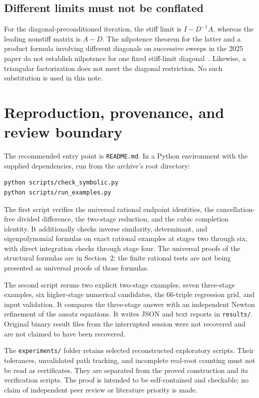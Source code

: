 \documentclass[11pt]{article}
\theoremstyle{remark}
\begin{document}
\subsection{Different limits must not be conflated}
For the diagonal-preconditioned iteration, the stiff limit is
$I-D^{-1}A$, whereas the leading nonstiff matrix is $A-D$. The nilpotence theorem
for the latter and a product formula involving different diagonals on successive
sweeps in the 2025 paper do not establish nilpotence for one fixed stiff-limit
diagonal~\cite[\S\S2.2.2--2.2.4]{sdc}. Likewise, a triangular factorization does
not meet the diagonal restriction. No such substitution is used in this note.

\section{Reproduction, provenance, and review boundary}
The recommended entry point is \texttt{README.md}. In a Python environment with
the supplied dependencies, run from the archive's root directory:
\begin{verbatim}
python scripts/check_symbolic.py
python scripts/run_examples.py
\end{verbatim}
The first script verifies the universal rational endpoint identities, the
cancellation-free divided difference, the two-stage reduction, and the cubic
completion identity. It additionally checks inverse similarity, determinant,
and eigenpolynomial formulas on exact rational examples at stages two through
six, with direct integration checks through stage four. The universal proofs of
the structural formulas are in Section~2; the finite rational tests are not
being presented as universal proofs of those formulas.

The second script reruns two explicit two-stage examples, seven three-stage
examples, six higher-stage numerical candidates, the 66-triple regression grid,
and input validation. It compares the three-stage answer with an independent
Newton refinement of the ansatz equations. It writes JSON and text reports in
\texttt{results/}. Original binary result files from the interrupted session
were not recovered and are not claimed to have been recovered.

The \texttt{experiments/} folder retains selected reconstructed exploratory
scripts. Their tolerances, unvalidated path tracking, and incomplete real-root
counting must not be read as certificates. They are separated from the proved
construction and its verification scripts. The proof is intended to be
self-contained and checkable; no claim of independent peer review or literature
priority is made.
\end{document}
